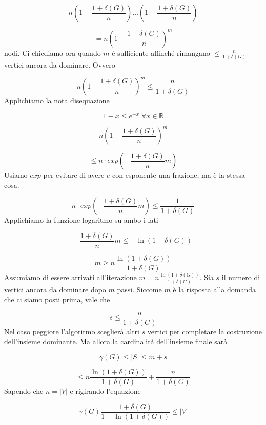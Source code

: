 \documentclass[12pt]{report}
\begin{document}
\begin{dimo}
$$n(1-\frac{1 +\delta(G)}{n}) \dots (1-\frac{1 +\delta(G)}{n})$$

$$= n(1-\frac{1 +\delta(G)}{n})^m$$
nodi. Ci chiediamo ora quando $m$ è sufficiente affinché rimangano $\leq \frac{n}{1 + \delta(G)}$ vertici ancora da dominare. Ovvero

$$n(1-\frac{1 +\delta(G)}{n})^m \leq \frac{n}{1 + \delta(G)}$$
Applichiamo la nota disequazione 

$$1-x \leq e^{-x} \; \forall x \in \mathbb{R}$$




$$n(1-\frac{1 +\delta(G)}{n})^m $$

$$\leq n \cdot exp(-\frac{1 + \delta(G)}{n}m)$$ Usiamo $exp$ per evitare di avere $e$ con esponente una frazione, ma è la stessa cosa.

$$n \cdot exp(-\frac{1 + \delta(G)}{n}m)\leq \frac{1}{1 + \delta(G)}$$ Applichiamo la funzione logaritmo su ambo i lati

$$- \frac{1 + \delta(G)}{n} m \leq -\ln(1+ \delta(G)) $$

$$m \geq  n \frac{\ln(1 + \delta(G))}{1 + \delta(G)}$$
Assumiamo di essere arrivati all'iterazione $m = n \frac{\ln(1 + \delta(G))}{1 + \delta(G)}$. Sia $s$ il numero di vertici ancora da dominare dopo $m$ passi.  Siccome $m$ è la risposta alla domanda che ci siamo posti prima, vale che

$$s \leq \frac{n}{1 + \delta(G)}$$ 
Nel caso peggiore l'algoritmo sceglierà altri $s$ vertici per completare la costruzione dell'insieme dominante. Ma allora la cardinalità dell'insieme finale sarà 

$$\gamma(G) \leq |S| \leq m + s$$

$$\leq n \frac{\ln(1 + \delta(G))}{1 + \delta(G)} +  \frac{n}{1 + \delta(G)}$$ Sapendo che $n = |V|$ e rigirando l'equazione

$$\gamma(G) \frac{1 + \delta(G)}{1 + \ln{(1 + \delta(G))}} \leq |V|$$

\end{dimo}
\end{document}
